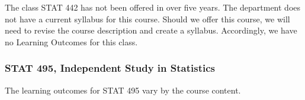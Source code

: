 \documentclass[11pt]{article}
\begin{document}
The class STAT 442 has not been offered in over five years. The
department does not have a current syllabus for this course. Should we offer this course,  we will need to revise
the course description and create a syllabus. Accordingly, we have no Learning Outcomes for this class.

\subsubsection*{STAT 495, Independent Study in Statistics}

The learning outcomes for STAT 495 vary by the course content.

\end{document}
